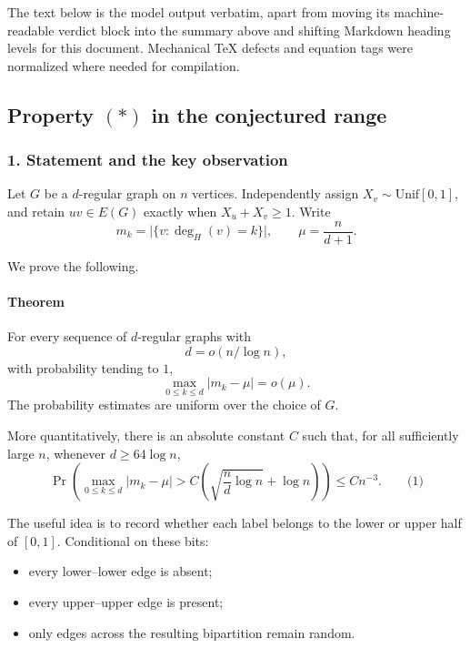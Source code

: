 \documentclass[
  11pt,
  a4paper,
]{article}
\providecommand{\tightlist}{%
  \setlength{\itemsep}{0pt}\setlength{\parskip}{0pt}}
\begin{document}
The text below is the model output verbatim, apart from moving its
machine-readable verdict block into the summary above and shifting
Markdown heading levels for this document. Mechanical TeX defects and
equation tags were normalized where needed for compilation.

\subsection{\texorpdfstring{Property \((*)\) in the conjectured
range}{Property (*) in the conjectured range}}\label{property-in-the-conjectured-range}

\subsubsection{1. Statement and the key
observation}\label{statement-and-the-key-observation}

Let \(G\) be a \(d\)-regular graph on \(n\) vertices. Independently
assign \(X_v\sim\mathrm{Unif}[0,1]\), and retain \(uv\in E(G)\) exactly
when \(X_u+X_v\ge1\). Write \[
m_k=\bigl|\{v:\deg_H(v)=k\}\bigr|,
\qquad
\mu=\frac{n}{d+1}.
\]

We prove the following.

\paragraph{Theorem}\label{theorem}

For every sequence of \(d\)-regular graphs with \[
d=o(n/\log n),
\] with probability tending to \(1\), \[
\max_{0\le k\le d}|m_k-\mu|=o(\mu).
\] The probability estimates are uniform over the choice of \(G\).

More quantitatively, there is an absolute constant \(C\) such that, for
all sufficiently large \(n\), whenever \(d\ge64\log n\), \[
\Pr\left(
\max_{0\le k\le d}|m_k-\mu|
>
C\left(\sqrt{\frac nd\log n}+\log n\right)
\right)
\le Cn^{-3}.
\qquad\text{(1)}
\]

The useful idea is to record whether each label belongs to the lower or
upper half of \([0,1]\). Conditional on these bits:

\begin{itemize}
\tightlist
\item
  every lower--lower edge is absent;
\item
  every upper--upper edge is present;
\item
  only edges across the resulting bipartition remain random.
\end{itemize}
\end{document}
